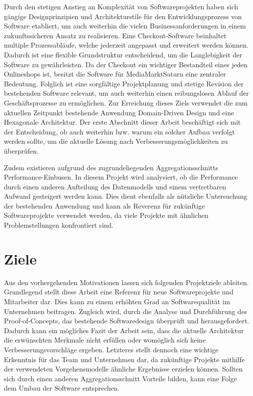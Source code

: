 Durch den stetigen Anstieg an Komplexität von Softwareprojekten haben sich gängige Designprinzipien und Architekturstile für den Entwicklungsprozess von Software etabliert, um auch weiterhin die vielen Businessanforderungen in einem zukunftssicheren Ansatz zu realisieren. Eine Checkout-Software beinhaltet multiple Prozessabläufe, welche jederzeit angepasst und erweitert werden können. Dadurch ist eine flexible Grundstruktur entscheidend, um die Langlebigkeit der Software zu gewährleisten. Da der Checkout ein wichtiger Bestandteil eines jeden Onlineshops ist, besitzt die Software für MediaMarktSaturn eine zentraler Bedeutung. Folglich ist eine sorgfältige Projektplanung und stetige Revision der bestehenden Software relevant, um auch weiterhin einen reibungslosen Ablauf der Geschäftsprozesse zu ermöglichen. Zur Erreichung dieses Ziels verwendet die zum aktuellen Zeitpunkt bestehende Anwendung Domain-Driven Design und eine Hexagonale Architektur. Der erste Abschnitt dieser Arbeit beschäftigt sich mit der Entscheidung, ob auch weiterhin bzw. warum ein solcher Aufbau verfolgt werden sollte, um die aktuelle Lösung nach Verbesserungsmöglichkeiten zu überprüfen. 

Zudem existieren aufgrund des zugrundeliegenden Aggregationsschnitts Performance-Einbusen. In diesem Projekt wird analysiert, ob die Performance durch einen anderen Aufteilung des Datenmodells und einem vertretbaren Aufwand gesteigert werden kann. Dies dient ebenfalls als nützliche Untersuchung der bestehenden Anwendung und kann als Reverenz für zukünftige Softwareprojekte verwendet werden, da viele Projekte mit ähnlichen Problemstellungen konfrontiert sind.



\section{Ziele}


Aus den vorhergehenden Motivationen lassen sich folgenden Projektziele ableiten. Grundlegend stellt diese Arbeit eine Referenz für neue Softwareprojekte und Mitarbeiter dar. Dies kann zu einem erhöhten Grad an Softwarequalität im Unternehmen beitragen. Zugleich wird, durch die Analyse und Durchführung des Proof-of-Concepts, das bestehende Softwaredesign überprüft und herausgefordert. Dadurch kann ein mögliches Fazit der Arbeit sein, dass die aktuelle Architektur die erwünschten Merkmale nicht erfüllen oder womöglich sich keine Verbesserungsvorschläge ergeben. Letzteres stellt dennoch eine wichtige Erkenntnis für das Team und Unternehmen dar, da zukünftige Projekte mithilfe der verwendeten Vorgehensmodelle ähnliche Ergebnisse erzielen können. Sollten sich durch einen anderen Aggregationsschnitt Vorteile bilden, kann eine Folge dem Umbau der Software entsprechen.
